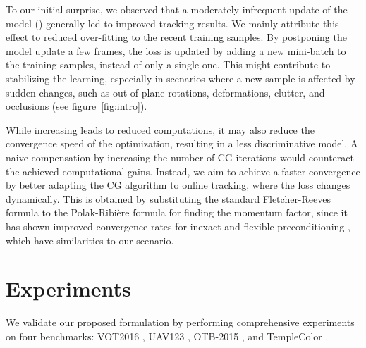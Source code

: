 \documentclass[10pt,twocolumn,letterpaper]{article}
\begin{document}
To our initial surprise, we observed that a moderately infrequent update of the model () generally led to improved tracking results. We mainly attribute this effect to reduced over-fitting to the recent training samples. By postponing the model update a few frames, the loss is updated by adding a new mini-batch to the training samples, instead of only a single one. This might contribute to stabilizing the learning, especially in scenarios where a new sample is affected by sudden changes, such as out-of-plane rotations, deformations, clutter, and occlusions (see figure~\ref{fig:intro}).

While increasing  leads to reduced computations, it may also reduce the convergence speed of the optimization, resulting in a less discriminative model. A naive compensation by increasing the number of CG iterations  would counteract the achieved computational gains. Instead, we aim to achieve a faster convergence by better adapting the CG algorithm to online tracking, where the loss changes dynamically. This is obtained by substituting the standard Fletcher-Reeves formula to the Polak-Ribi\`ere formula \cite{CGpain} for finding the momentum factor, since it has shown improved convergence rates for inexact and flexible preconditioning \cite{IPCG}, which have similarities to our scenario.
 
\section{Experiments}
We validate our proposed formulation by performing comprehensive experiments on
four benchmarks: VOT2016 \cite{VOT2016}, UAV123 \cite{UAV123}, OTB-2015 \cite{OTB2015}, and TempleColor \cite{TempleColor}.

\begin{table}[!t]
	\centering
	\vspace{1mm}\caption{The settings of the proposed factorized convolution approach, as employed in our experiments. For each feature, we show the dimensionality  and the number of filters .}\label{tab:fac_settings}\vspace{-3mm}
\end{table}
\end{document}
